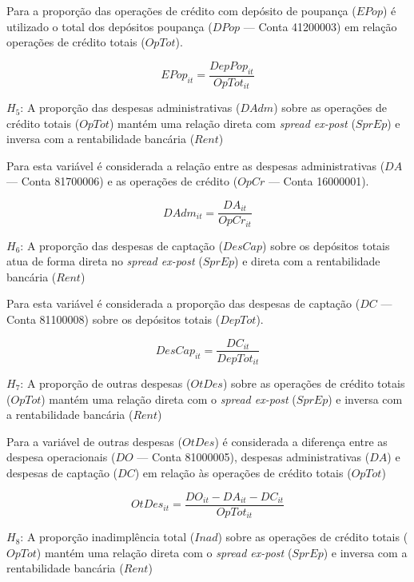 \documentclass[
  12pt,
  12pt,
  openright,
  oneside,
  a4paper,
  chapter=TITLE,
  section=TITLE,
  subsection=TITLE,
  subsubsection=TITLE,
  portugues,
  sumario=tradicional]{abntex2}
\begin{document}
Para a proporção das operações de crédito com depósito de poupança (\(EPop\)) é utilizado o total dos depósitos poupança (\(DPop\) --- Conta 41200003) em relação operações de crédito totais (\(OpTot\)).

\begin{equation}
EPop_{it} = \frac{DepPop_{it}}{OpTot_{it}}
\end{equation}

\(H_{5}\): A proporção das despesas administrativas (\(DAdm\)) sobre as operações de crédito totais (\(OpTot\)) mantém uma relação direta com \emph{spread ex-post} (\(SprEp\)) e inversa com a rentabilidade bancária (\(Rent\))

Para esta variável é considerada a relação entre as despesas administrativas (\(DA\) --- Conta 81700006) e as operações de crédito (\(OpCr\) --- Conta 16000001).

\begin{equation}
DAdm_{it} = \frac{DA_{it}}{OpCr_{it}}
\end{equation}

\(H_{6}\): A proporção das despesas de captação (\(DesCap\)) sobre os depósitos totais atua de forma direta no \emph{spread ex-post} (\(SprEp\)) e direta com a rentabilidade bancária (\(Rent\))

Para esta variável é considerada a proporção das despesas de captação (\(DC\) --- Conta 81100008) sobre os depósitos totais (\(DepTot\)).

\begin{equation}
DesCap_{it} = \frac{DC_{it}}{DepTot_{it}}
\end{equation}

\(H_{7}\): A proporção de outras despesas (\(OtDes\)) sobre as operações de crédito totais (\(OpTot\)) mantém uma relação direta com o \emph{spread ex-post} (\(SprEp\)) e inversa com a rentabilidade bancária (\(Rent\))

Para a variável de outras despesas (\(OtDes\)) é considerada a diferença entre as despesa operacionais (\(DO\) --- Conta 81000005), despesas administrativas (\(DA\)) e despesas de captação (\(DC\)) em relação às operações de crédito totais (\(OpTot\))

\begin{equation}
OtDes_{it} = \frac{ DO_{it} - DA_{it} - DC_{it} }{ OpTot_{it} }
\end{equation}

\(H_{8}\): A proporção inadimplência total (\(Inad\)) sobre as operações de crédito totais (\(OpTot\)) mantém uma relação direta com o \emph{spread ex-post} (\(SprEp\)) e inversa com a rentabilidade bancária (\(Rent\))
\end{document}
